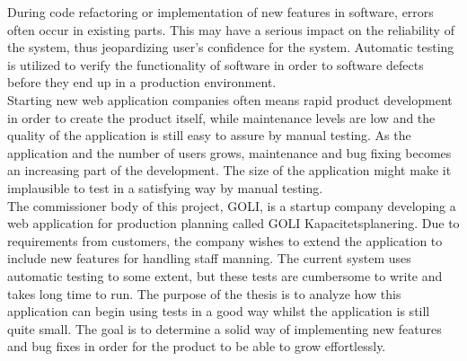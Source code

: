 During code refactoring or implementation of new features in software,
errors often occur in existing parts. This may have a serious impact on
the reliability of the system, thus jeopardizing user's confidence for
the system. Automatic testing is utilized to verify the functionality of
software in order to software defects before they end up in a production
environment.\\

Starting new web application companies often means rapid product
development in order to create the product itself, while maintenance
levels are low and the quality of the application is still easy to
assure by manual testing. As the application and the number of users
grows, maintenance and bug fixing becomes an increasing part of the
development. The size of the application might make it implausible to
test in a satisfying way by manual testing.\\

The commissioner body of this project, GOLI, is a startup company
developing a web application for production planning called GOLI
Kapacitetsplanering. Due to requirements from customers, the company
wishes to extend the application to include new features for handling
staff manning. The current system uses automatic testing to some extent,
but these tests are cumbersome to write and takes long time to run. The
purpose of the thesis is to analyze how this application can begin using
tests in a good way whilst the application is still quite small. The
goal is to determine a solid way of implementing new features and bug
fixes in order for the product to be able to grow effortlessly.\\
